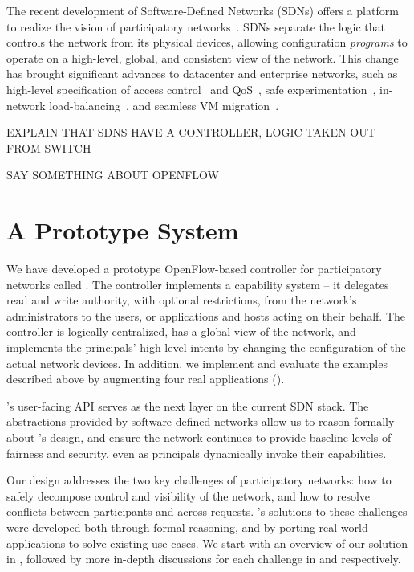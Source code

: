 The recent development of Software-Defined Networks (SDNs)
offers a platform to realize the vision of participatory networks~\cite{Greenberg:2005,McKeown:2008}.
SDNs separate
the logic that controls the network from its physical
devices, allowing configuration \emph{programs} to operate on a
high-level, global, and consistent view of the network. 
This change has brought significant advances to datacenter and
enterprise networks, such as high-level
specification of access control~\cite{Nayak:2009} and
QoS~\cite{Kim:2010}, safe experimentation~\cite{Sherwood:2010},
in-network load-balancing~\cite{wang11wild}, and seamless VM 
migration~\cite{Erickson:2008}.

{\color{red} EXPLAIN THAT SDNS HAVE A CONTROLLER, LOGIC TAKEN OUT FROM SWITCH }

{\color{red} SAY SOMETHING ABOUT OPENFLOW }

\section{A Prototype System}

We have developed a prototype OpenFlow-based controller
for participatory networks called \sys.
The \sys controller implements a capability system --
it delegates read and
write authority, with optional restrictions, from the network's
administrators to the users, or applications and hosts acting on
their behalf.  The controller is logically centralized, has a global
view of the network, and implements the principals' high-level
intents by changing the configuration of the actual network devices.
In addition, we implement and evaluate the examples described
above by augmenting four real applications ().

\sys's user-facing API serves as the next layer on the current SDN stack.
The abstractions provided by software-defined networks allow us
to reason formally about \sys's design, and ensure the network
continues to provide baseline levels of fairness and security, even as principals
dynamically invoke their capabilities.

Our design addresses the two key challenges of participatory networks:
how to safely decompose control and visibility of the network, and how to resolve conflicts
between participants and across requests. 
\sys's solutions to these challenges were developed both through formal reasoning,
and by porting real-world applications to solve existing use cases.
We start with an overview of our solution in ,
followed by more in-depth discussions for each challenge in 
and  respectively.


